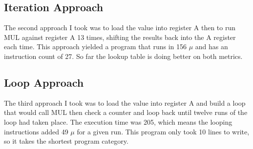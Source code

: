 \documentclass{article}
\begin{document}
\subsection* {
  Iteration Approach
}

The second approach I took was to load the value into register A then
to run MUL against register A 13 times, shifting the results back into
the A register each time.  This approach yielded a program that runs in
156 $\mu$ and has an instruction count of 27. So far the lookup table is
doing better on both metrics.

\subsection*{
  Loop Approach
}

The third approach I took was to load the value into register A and build
a loop that would call MUL then check a counter and loop back until twelve
runs of the loop had taken place.  The execution time was 205, which means
the looping instructions added 49 $\mu$ for a given run.  This program only
took 10 lines to write, so it takes the shortest program category.
\end{document}
